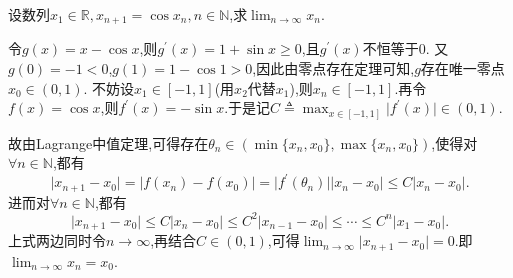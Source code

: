 \documentclass[../../main.tex]{subfiles}%
\begin{document}
\begin{example}
设数列\(x_1\in\mathbb{R},x_{n + 1} = \cos x_n,n\in\mathbb{N}\),求\(\lim_{n \to \infty} x_n\).
\end{example}
\begin{solution}

令\(g(x)=x - \cos x\),则\(g^\prime(x)=1 + \sin x\geqslant0\),且\(g^\prime(x)\)不恒等于\(0\).
又\(g(0)= -1 < 0\),\(g(1)=1 - \cos 1 > 0\),因此由零点存在定理可知,\(g\)存在唯一零点\(x_0\in(0,1)\).
不妨设\(x_1\in[-1,1]\)(用\(x_2\)代替\(x_1\)),则\(x_n\in[-1,1]\).再令\(f(x)=\cos x\),则\(f^\prime(x)=-\sin x\).于是记\(C\triangleq \max_{x\in[-1,1]}\vert f^\prime(x)\vert\in(0,1)\).

故由Lagrange中值定理,可得存在\(\theta_n\in(\min\{x_n,x_0\},\max\{x_n,x_0\})\),使得对\(\forall n\in\mathbb{N}\),都有
\[
\vert x_{n + 1}-x_0\vert=\vert f(x_n)-f(x_0)\vert=\vert f^\prime(\theta_n)\vert\vert x_n - x_0\vert\leqslant C\vert x_n - x_0\vert.
\]
进而对\(\forall n\in\mathbb{N}\),都有
\[
\vert x_{n + 1}-x_0\vert\leqslant C\vert x_n - x_0\vert\leqslant C^2\vert x_{n - 1}-x_0\vert\leqslant\cdots\leqslant C^n\vert x_1 - x_0\vert.
\]
上式两边同时令\(n\rightarrow\infty\),再结合\(C\in(0,1)\),可得\(\lim_{n\rightarrow\infty}\vert x_{n + 1}-x_0\vert = 0\).即\(\lim_{n\rightarrow\infty}x_n = x_0\).

\end{solution}
\end{document}
